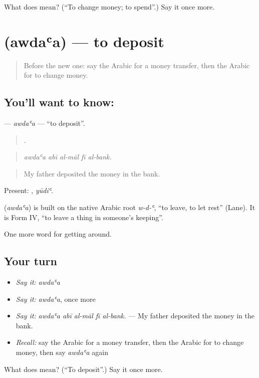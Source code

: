 \begin{tcolorbox}[breakable,colback=teal!4,colframe=teal!35!black,title={Before you move on}]
What does  mean? (\textquotedblleft{}To change money; to spend\textquotedblright{}.) Say it once more.
\end{tcolorbox}
\section[\texorpdfstring{\ar{أودع} (awdaʿa)}{أودع (awdaʿa)}]{ (awdaʿa) — to deposit}

\label{lesson:AR-C452-awdaa}



\begin{quote}
Before the new one: say the Arabic for a money transfer, then the Arabic for to change money.
\end{quote}

\subsection*{You'll want to know: }
\textbf{} — \emph{awdaʿa} — \textquotedblleft{}to deposit\textquotedblright{}.

\begin{quote}
    .
\end{quote}

\begin{quote}
\emph{awdaʿa abī al-māl fī al-bank.}
\end{quote}

\begin{quote}
My father deposited the money in the bank.
\end{quote}

Present: , \emph{yūdiʿ}.

\begin{cousinweb}
\textbf{} (\emph{awdaʿa}) is built on the native Arabic root \emph{w-d-ʿ}, \textquotedblleft{}to leave, to let rest\textquotedblright{} (Lane). It is Form IV, \textquotedblleft{}to leave a thing in someone's keeping\textquotedblright{}.
\end{cousinweb}

\begin{grammarlens}[title={What you've built}]
One more word for getting around.
\end{grammarlens}

\subsection*{Your turn}
\begin{itemize}
\raggedright
  \item \emph{Say it:} \emph{awdaʿa}
  \item \emph{Say it:} \emph{awdaʿa}, once more
  \item \emph{Say it:} \emph{awdaʿa abī al-māl fī al-bank.} — My father deposited the money in the bank.
  \item \emph{Recall:} say the Arabic for a money transfer, then the Arabic for to change money, then say \emph{awdaʿa} again
\end{itemize}

\begin{tcolorbox}[breakable,colback=teal!4,colframe=teal!35!black,title={Before you move on}]
What does  mean? (\textquotedblleft{}To deposit\textquotedblright{}.) Say it once more.
\end{tcolorbox}
